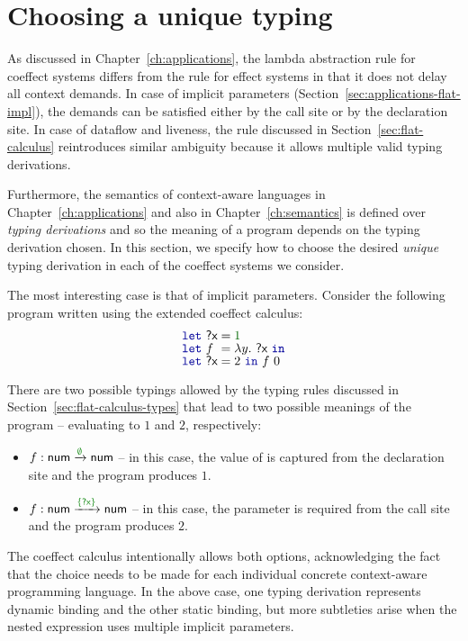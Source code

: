 \section{Choosing a unique typing}
\label{sec:flat-unique}

As discussed in Chapter~\ref{ch:applications}, the lambda abstraction rule for coeffect systems
differs from the rule for effect systems in that it does not delay all context demands.
In case of implicit parameters (Section~\ref{sec:applications-flat-impl}), the demands
can be satisfied either by the call site or by the declaration site. In case of dataflow and
liveness, the rule discussed in Section~\ref{sec:flat-calculus} reintroduces similar ambiguity
because it allows multiple valid typing derivations.

Furthermore, the semantics of context-aware languages in Chapter~\ref{ch:applications} and
also in Chapter~\ref{ch:semantics} is defined over \emph{typing derivations} and so the meaning
of a program depends on the typing derivation chosen. In this section, we specify how to choose
the desired \emph{unique} typing derivation in each of the coeffect systems we consider.

The most interesting case is that of implicit parameters. Consider the following
program written using the extended coeffect calculus:
%
\begin{equation*}
\begin{array}{l}
\kvd{let}~\ident{?x}=\num{1}\\[-0.2em]
\kvd{let}~f~= \lambda y.~\ident{?x}~\kvd{in} \\[-0.2em]
\kvd{let}~\ident{?x}=2~\kvd{in}~f~0 \\[-0.2em]
\end{array}
\end{equation*}

\noindent
There are two possible typings allowed by the typing rules discussed in Section~\ref{sec:flat-calculus-types}
that lead to two possible meanings of the program -- evaluating to $1$ and $2$, respectively:
%
\begin{itemize}
  \item $f : \ident{num} \xrightarrow{\cclrd{\emptyset}} \ident{num}$ -- in this case, the value
    of  is captured from the declaration site and the program produces $1$.
  \item $f : \ident{num} \xrightarrow{\cclrd{\{ \ident{?x} \}}} \ident{num}$ -- in this case, the
    parameter  is required from the call site and the program produces $2$.
\end{itemize}
%
The coeffect calculus intentionally allows both options, acknowledging the fact that the
choice needs to be made for each individual concrete context-aware programming language. In the
above case, one typing derivation represents dynamic binding and the other static binding, but
more subtleties arise when the nested expression uses multiple implicit parameters.

